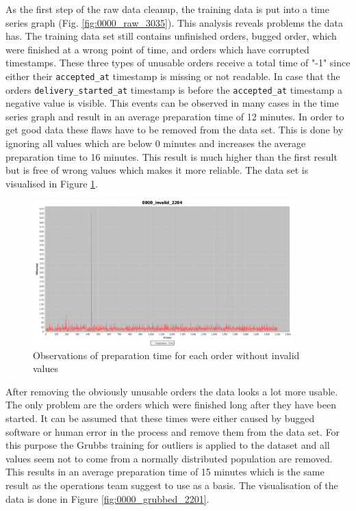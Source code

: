 As the first step of the raw data cleanup, the training data is put into a time series graph (Fig. \ref{fig:0000_raw_3035}). This analysis reveals problems the data has. The training data set still contains unfinished orders, bugged order, which were finished at a wrong point of time, and orders which have corrupted timestamps. These three types of unusable orders receive a total time of "-1" since either their \texttt{accepted\_at} timestamp is missing or not readable. In case that the orders \texttt{delivery\_started\_at} timestamp is before the \texttt{accepted\_at} timestamp a negative value is visible. This events can be observed in many cases in the time series graph and result in an average preparation time of 12 minutes. In order to get good data these flaws have to be removed from the data set. This is done by ignoring all values which are below 0 minutes and increases the average preparation time to 16 minutes. This result is much higher than the first result but is free of wrong values which makes it more reliable. The data set is visualised in Figure \ref{fig:0000_invalid_2204}.

\begin{figure}[h]
\begin{center}
\includegraphics[width=10cm]{images/0000_invalid_2204.png}
\caption{Observations of preparation time for each order without invalid values}
\label{fig:0000_invalid_2204}
\end{center}
\end{figure}

After removing the obviously unusable orders the data looks a lot more usable. The only problem are the orders which were finished long after they have been started. It can be assumed that these times were either caused by bugged software or human error in the process and remove them from the data set. For this purpose the Grubbs training for outliers is applied to the dataset and all values seem not to come from a normally distributed population are removed. This results in an average preparation time of 15 minutes which is the same result as the operations team suggest to use as a basis. The visualisation of the data is done in Figure \ref{fig:0000_grubbed_2201}.

